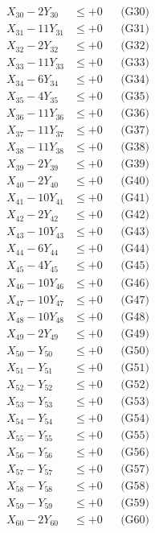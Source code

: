 \documentclass[a4paper,10pt]{article}
\begin{document}
{\begin{align}
\allowbreak
X_{30} - 2Y_{30} &\leq +0 && \text{(G30)} \\
X_{31} - 11Y_{31} &\leq +0 && \text{(G31)} \\
X_{32} - 2Y_{32} &\leq +0 && \text{(G32)} \\
X_{33} - 11Y_{33} &\leq +0 && \text{(G33)} \\
X_{34} - 6Y_{34} &\leq +0 && \text{(G34)} \\
X_{35} - 4Y_{35} &\leq +0 && \text{(G35)} \\
X_{36} - 11Y_{36} &\leq +0 && \text{(G36)} \\
X_{37} - 11Y_{37} &\leq +0 && \text{(G37)} \\
X_{38} - 11Y_{38} &\leq +0 && \text{(G38)} \\
X_{39} - 2Y_{39} &\leq +0 && \text{(G39)} \\
\allowbreak
X_{40} - 2Y_{40} &\leq +0 && \text{(G40)} \\
X_{41} - 10Y_{41} &\leq +0 && \text{(G41)} \\
X_{42} - 2Y_{42} &\leq +0 && \text{(G42)} \\
X_{43} - 10Y_{43} &\leq +0 && \text{(G43)} \\
X_{44} - 6Y_{44} &\leq +0 && \text{(G44)} \\
X_{45} - 4Y_{45} &\leq +0 && \text{(G45)} \\
X_{46} - 10Y_{46} &\leq +0 && \text{(G46)} \\
X_{47} - 10Y_{47} &\leq +0 && \text{(G47)} \\
X_{48} - 10Y_{48} &\leq +0 && \text{(G48)} \\
X_{49} - 2Y_{49} &\leq +0 && \text{(G49)} \\
\allowbreak
X_{50} - Y_{50} &\leq +0 && \text{(G50)} \\
X_{51} - Y_{51} &\leq +0 && \text{(G51)} \\
X_{52} - Y_{52} &\leq +0 && \text{(G52)} \\
X_{53} - Y_{53} &\leq +0 && \text{(G53)} \\
X_{54} - Y_{54} &\leq +0 && \text{(G54)} \\
X_{55} - Y_{55} &\leq +0 && \text{(G55)} \\
X_{56} - Y_{56} &\leq +0 && \text{(G56)} \\
X_{57} - Y_{57} &\leq +0 && \text{(G57)} \\
X_{58} - Y_{58} &\leq +0 && \text{(G58)} \\
X_{59} - Y_{59} &\leq +0 && \text{(G59)} \\
\allowbreak
X_{60} - 2Y_{60} &\leq +0 && \text{(G60)} \\

\end{align}}
\end{document}
